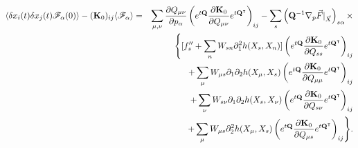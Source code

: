 \begin{eqnarray}
\langle \delta x_i(t) \delta x_j(t){\mathscr F}_\alpha(0)\rangle -({\bf K}_0)_{ij}\langle{\mathscr F}_\alpha\rangle&=&  \sum_{\mu,\nu}\frac {\partial Q_{\mu\nu}}{\partial p_\alpha}\left(e^{t{\bf Q}}\frac{\partial {\bf K}_0}{\partial Q_{\mu \nu}}e^{t{\bf Q}^\intercal}\right)_{ij}-  \sum_s \left({\bf Q}^{-1} \nabla_p{\vec { F}}|_{\vec X} \right)_{s\alpha} \times\nonumber\\
& &\Biggl\{ [ f_s''+  \sum_n W_{sn}\partial_1^2h(X_s,X_n)] \left(e^{t{\bf Q}}\frac{\partial {\bf K}_0}{\partial Q_{ss}}e^{t{\bf Q}^\intercal}\right)_{ij} \\
   & & +\sum_\mu W_{\mu s}\partial_1\partial_2h(X_\mu,X_s) \left(e^{t{\bf Q}}\frac{\partial {\bf K}_0}{\partial Q_{\mu\mu}}e^{t{\bf Q}^\intercal}\right)_{ij}\nonumber\\
   & & +  \sum_\nu W_{s\nu} \partial_1\partial_2h(X_s,X_\nu)    \left(e^{t{\bf Q}}\frac{\partial {\bf K}_0}{\partial Q_{s\nu}}e^{t{\bf Q}^\intercal}\right)_{ij}    \nonumber\\
   & & +\sum_\mu W_{\mu s}  \partial_2^2h(X_\mu,X_s)\left(e^{t{\bf Q}}\frac{\partial {\bf K}_0}{\partial Q_{\mu s}}e^{t{\bf Q}^\intercal}\right)_{ij}
   \Biggr\}. \nonumber
\end{eqnarray}
